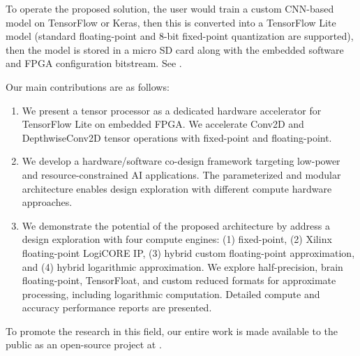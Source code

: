 To operate the proposed solution, the user would train a custom CNN-based model on TensorFlow or Keras, then this is converted into a TensorFlow Lite model (standard floating-point and 8-bit fixed-point quantization are supported), then the model is stored in a micro SD card along with the embedded software and FPGA configuration bitstream. See .

Our main contributions are as follows:
\begin{enumerate}
	\item We present a tensor processor as a dedicated hardware accelerator for TensorFlow Lite on embedded FPGA. We accelerate Conv2D and DepthwiseConv2D tensor operations with fixed-point and floating-point.
	\item We develop a hardware/software co-design framework targeting low-power and resource-constrained AI applications. The parameterized and modular architecture enables design exploration with different compute hardware approaches.
	\item We demonstrate the potential of the proposed architecture by address a design exploration with four compute engines: (1) fixed-point, (2) Xilinx floating-point LogiCORE IP, (3) hybrid custom floating-point approximation, and (4) hybrid logarithmic approximation. We explore half-precision, brain floating-point, TensorFloat, and custom reduced formats for approximate processing, including logarithmic computation. Detailed compute and accuracy performance reports are presented.
\end{enumerate}

To promote the research in this field, our entire work is made available to the public as an open-source project at .